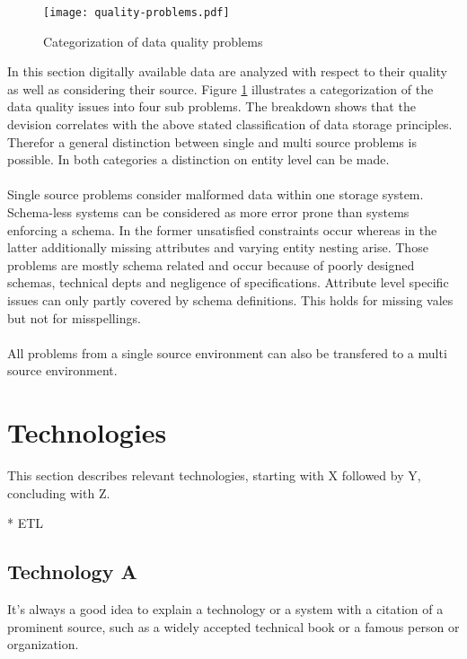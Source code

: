 \begin{figure}[htb]
  \centering
  \texttt{[image: quality-problems.pdf]}\\
  \caption{Categorization of data quality problems}\label{fig:qualityproblems}
\end{figure}

In this section digitally available data are analyzed with respect to their quality as well as considering their source. Figure \ref{fig:qualityproblems} illustrates a categorization of the data quality issues into four sub problems. The breakdown shows that the devision correlates with the above stated classification of data storage principles. Therefor a general distinction between single and multi source problems is possible. In both categories a distinction on entity level can be made. 
\\\\
Single source problems consider malformed data within one storage system. Schema-less systems can be considered as more error prone than systems enforcing a schema. In the former unsatisfied constraints occur whereas in the latter additionally missing attributes and varying entity nesting arise. Those problems are mostly schema related and occur because of poorly designed schemas, technical depts and negligence of specifications. Attribute level specific issues can only partly covered by schema definitions. This holds for missing vales but not for misspellings. 
\\\\
All problems from a single source environment can also be transfered to a multi source environment. 

\section{Technologies \label{sec:tech}}

This section describes relevant technologies, starting with X followed by Y, concluding with Z.

* ETL

\subsection{Technology A\label{sec:aaa}}

It's always a good idea to explain a technology or a system with a citation of a prominent source, such as a widely accepted technical book or a famous person or organization. 

